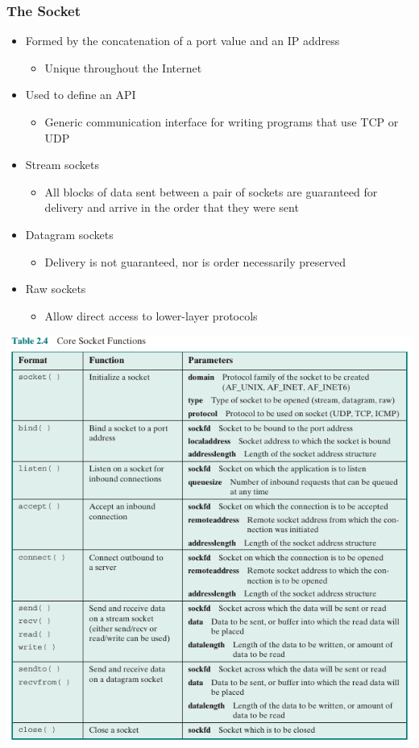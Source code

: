 \documentclass[pdflatex,compress]{beamer}
\begin{document}
\begin{frame}
	\frametitle{The Socket}
	\begin{itemize}
		\item Formed by the concatenation of a port value and an IP address
		\begin{itemize}
			\item Unique throughout the Internet
		\end{itemize}
		\item Used to define an API
		\begin{itemize}
			\item Generic communication interface for writing programs that use TCP or UDP
		\end{itemize}
		\item Stream sockets
		\begin{itemize}
			\item All blocks of data sent between a pair of sockets are guaranteed for delivery and arrive in the order that they were sent
		\end{itemize}
		\item Datagram sockets
		\begin{itemize}
			\item Delivery is not guaranteed, nor is order necessarily preserved
		\end{itemize}
		\item Raw sockets
		\begin{itemize}
			\item Allow direct access to lower-layer protocols
		\end{itemize}
	\end{itemize}
\end{frame}

\begin{frame}
	\begin{center}
		\includegraphics[height=0.8\textheight]{img/img16}
	\end{center}
\end{frame}
\end{document}
